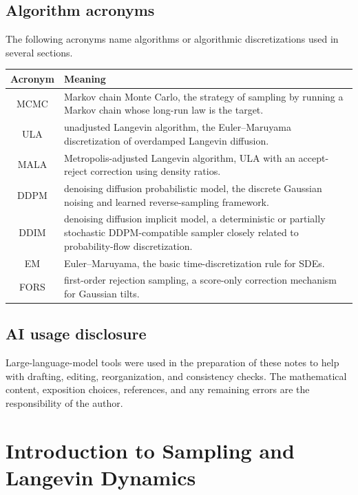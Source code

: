 \documentclass{amsart}
\numberwithin{equation}{section}
\theoremstyle{plain}
\theoremstyle{definition}
\theoremstyle{remark}
\newcommand{\AlgFORS}{\textsf{FORS}}
\begin{document}
\subsection*{Algorithm acronyms}

The following acronyms name algorithms or algorithmic discretizations used in
several sections.
\begin{center}
\begin{tabular}{c|p{}}
Acronym & Meaning \\ \hline
MCMC & Markov chain Monte Carlo, the strategy of sampling by running a Markov
chain whose long-run law is the target.\\
ULA & unadjusted Langevin algorithm, the Euler--Maruyama discretization of
overdamped Langevin diffusion.\\
MALA & Metropolis-adjusted Langevin algorithm, ULA with an accept-reject
correction using density ratios.\\
DDPM & denoising diffusion probabilistic model, the discrete Gaussian noising
and learned reverse-sampling framework.\\
DDIM & denoising diffusion implicit model, a deterministic or partially
stochastic DDPM-compatible sampler closely related to probability-flow
discretization.\\
EM & Euler--Maruyama, the basic time-discretization rule for SDEs.\\
\AlgFORS & first-order rejection sampling, a score-only correction mechanism
for Gaussian tilts.\\
\end{tabular}
\end{center}

\subsection*{AI usage disclosure}

Large-language-model tools were used in the preparation of these notes to help
with drafting, editing, reorganization, and consistency checks.  The
mathematical content, exposition choices, references, and any remaining errors
are the responsibility of the author.

\section{Introduction to Sampling and Langevin Dynamics}
\end{document}

